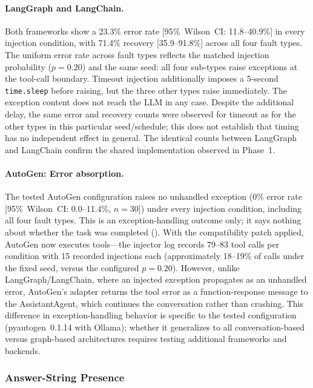 \documentclass[make,article,submit,moreauthors,pdftex]{mdpi}
\newcommand{\Wrev}[1]{\texorpdfstring{{\color{RevisionOrange}#1}}{#1}}
\begin{document}
\paragraph{LangGraph and LangChain.} Both frameworks show a 23.3\% error rate [95\%~Wilson~CI: 11.8--40.9\%] in every injection condition, with 71.4\% recovery [35.9--91.8\%] across all four fault types. The uniform error rate across fault types reflects the matched injection probability ($p = 0.20$) and the same seed: all four sub-types raise exceptions at the tool-call boundary. Timeout injection additionally imposes a 5-second \texttt{time.sleep} before raising, but the three other types raise immediately. The exception content does not reach the LLM in any case. Despite the additional delay, the same error and recovery counts were observed for timeout as for the other types in this particular seed/schedule; this does not establish that timing has no independent effect in general. The identical counts between LangGraph and LangChain confirm the shared implementation observed in Phase~1.

\paragraph{AutoGen: Error absorption.} \Wrev{The tested AutoGen configuration raises no unhandled exception} (0\% error rate [95\%~Wilson~CI: 0.0--11.4\%, $n = 30$]) under every injection condition, including all four fault types. \Wrev{This is an exception-handling outcome only; it says nothing about whether the task was completed (\Cref{sec:phase2-correctness}).} With the compatibility patch applied, AutoGen now executes tools---the injector log records 79--83 tool calls per condition with 15 recorded injections each (approximately 18--19\% of calls under the fixed seed, versus the configured $p = 0.20$). However, unlike LangGraph/LangChain, where an injected exception propagates as an unhandled error, AutoGen's adapter returns the tool error as a function-response message to the AssistantAgent, which continues the conversation rather than crashing. This difference in exception-handling behavior is specific to the tested configuration (pyautogen~0.1.14 with Ollama); whether it generalizes to all conversation-based versus graph-based architectures requires testing additional frameworks and backends.

\subsubsection{Answer-String Presence}\label{sec:phase2-correctness}
\end{document}
